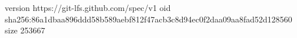 version https://git-lfs.github.com/spec/v1
oid sha256:86a1dbaa896ddd58b589aebf812f47acb3c8d94ec0f2daa09aa8fad52d128560
size 253667
